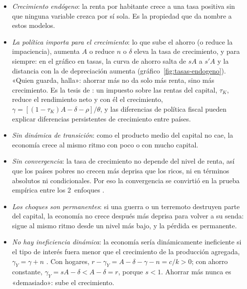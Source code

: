 \documentclass[11pt]{article}
\begin{document}
\begin{itemize}
\item \emph{Crecimiento endógeno}: la renta por habitante crece a una tasa positiva sin que ninguna variable crezca por sí sola. Es la propiedad que da nombre a estos modelos.
\item \emph{La política importa para el crecimiento}: lo que sube el ahorro (o reduce la impaciencia), aumenta $A$ o reduce $n$ o $\delta$ eleva la tasa de crecimiento, y para siempre: en el gráfico en tasas, la curva de ahorro salta de $sA$ a $s'A$ y la distancia con la de depreciación aumenta (gráfico~\ref{fig:tasas-endogeno}). «Quien guarda, halla»: ahorrar más no da solo más renta, sino más crecimiento. Es la tesis de \textcite{Rebelo1991Long}: un impuesto sobre las rentas del capital, $\tau_K$, reduce el rendimiento neto y con él el crecimiento, $\gamma=[(1-\tau_K)A-\delta-\rho]/\theta$, y las diferencias de política fiscal pueden explicar diferencias persistentes de crecimiento entre países.
\item \emph{Sin dinámica de transición}: como el producto medio del capital no cae, la economía crece al mismo ritmo con poco o con mucho capital.
\item \emph{Sin convergencia}: la tasa de crecimiento no depende del nivel de renta, así que los países pobres no crecen más deprisa que los ricos, ni en términos absolutos ni condicionales. Por eso la convergencia se convirtió en la prueba empírica entre los 2~enfoques .
\item \emph{Los choques son permanentes}: si una guerra o un terremoto destruyen parte del capital, la economía no crece después más deprisa para volver a su senda: sigue al mismo ritmo desde un nivel más bajo, y la pérdida es permanente.
\item \emph{No hay ineficiencia dinámica}\nocite{SaintPaul1992}: la economía sería dinámicamente ineficiente si el tipo de interés fuera menor que el crecimiento de la producción agregada, $\gamma_Y=\gamma+n$ . Con hogares, $r-\gamma_Y=A-\delta-\gamma-n=c/k>0$; con ahorro constante, $\gamma_Y=sA-\delta<A-\delta=r$, porque $s<1$. Ahorrar más nunca es «demasiado»: sube el crecimiento.
\end{itemize}
\end{document}
